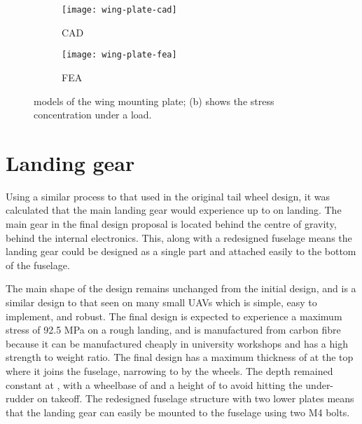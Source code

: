 \documentclass[../../main.tex]{subfiles}
\begin{document}

\begin{figure}[H]

    \centering
    \begin{subfigure}[b]{0.49\columnwidth}
        \centering
        \texttt{[image: wing-plate-cad]}
        \caption{CAD}
        \label{fig:wing-plate:cad}
    \end{subfigure}
    \hfill
    \begin{subfigure}[b]{0.49\columnwidth}
        \centering
        \texttt{[image: wing-plate-fea]}
        \caption{FEA}
        \label{fig:wing-plate:fea}
    \end{subfigure}
    
    \caption{
        models of the wing mounting plate; (b) shows the stress concentration under a  load.
    }
    \label{fig:wing-plate}
\end{figure}

\section{Landing gear} \label{sec:final-design-proposal:landing-gear}

Using a similar process to that used in the original tail wheel design, it was calculated that the main landing gear would experience up to  on landing.  %
The main gear in the final design proposal is located behind the centre of gravity, behind the internal electronics.
This, along with a redesigned fuselage means the landing gear could be designed as a single part and attached easily to the bottom of the fuselage. 


The main shape of the design remains unchanged from the initial design, and is a similar design to that seen on many small UAVs which is simple, easy to implement, and robust.
The final design is expected to experience a maximum stress of 92.5 MPa on a rough landing, and is manufactured from carbon fibre because it can be manufactured cheaply in university workshops and has a high strength to weight ratio.
The final design has a maximum thickness of  at the top where it joins the fuselage, narrowing to  by the wheels.
The depth remained constant at , with a wheelbase of  and a height of  to avoid hitting the under-rudder on takeoff.
The redesigned fuselage structure with two lower plates means that the landing gear can easily be mounted to the fuselage using two M4 bolts. 
\end{document}
